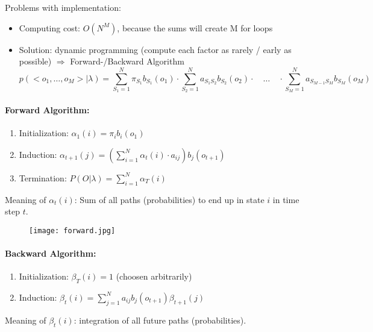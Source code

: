 Problems with implementation:
\begin{itemize}
	\item Computing cost: \(O(N^M)\), because the sums will create M for loops
	\item Solution: dynamic programming (compute each factor as rarely / early as possible) $\Rightarrow$ Forward-/Backward Algorithm
	\[p(<o_1,\dots,o_M>|\lambda) = \sum_{S_1=1}^{N} \pi_{S_1} b_{S_1}(o_1) \cdot \sum_{S_2=1}^{N} a_{S_1 S_2} b_{S_2}(o_2) \cdot \quad \ldots \quad \cdot \sum_{S_M=1}^{N} a_{S_{M - 1} S_{M}} b_{S_M}(o_M)\]
\end{itemize}

\paragraph{Forward Algorithm:}

\begin{enumerate}
    \item Initialization:
        \(\alpha_1(i) = \pi_i b_i(o_1)\)
    \item Induction:
        \(\alpha_{t+1}(j) = (\sum_{i=1}^N \alpha_t(i) \cdot a_{ij}) b_j(o_{t+1})\)
    \item Termination:
        \(P(O|\lambda) = \sum_{i=1}^N \alpha_T(i)\)
\end{enumerate}

Meaning of $\alpha_t(i)$: Sum of all paths (probabilities) to end up in state $i$ in time step $t$.

\begin{figure}[H]
	\centering
	\texttt{[image: forward.jpg]}
\end{figure}

\paragraph{Backward Algorithm:}

\begin{enumerate}
    \item Initialization: \(\beta_T (i) = 1\) (choosen arbitrarily)
    \item Induction: \(\beta_t(i) = \sum_{j=1}^N a_{ij} b_j(o_{t+1}) \beta_{t+1}(j)\)
\end{enumerate}

Meaning of $\beta_t(i)$: integration of all future paths (probabilities).

